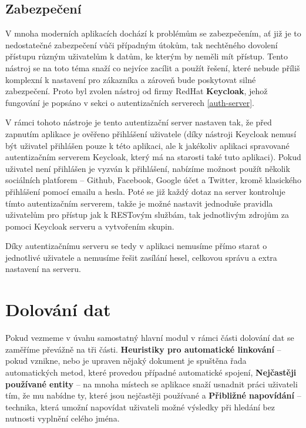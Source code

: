 \subsection{Zabezpečení}
\par V mnoha moderních aplikacích dochází k problémům se zabezpečením, ať již je to nedostatečné zabezpečení vůči případným útokům, tak nechtěného dovolení přístupu různým uživatelům k datům, ke kterým by neměli mít přístup. Tento nástroj se na toto téma snaží co nejvíce zacílit a použít řešení, které nebude příliš komplexní k nastavení pro zákazníka a zároveň bude poskytovat silné zabezpečení. Proto byl zvolen nástroj od firmy RedHat \textbf{Keycloak}, jehož fungování je popsáno v sekci o autentizačních serverech \ref{auth-server}.

\par V rámci tohoto nástroje je tento autentizační server nastaven tak, že před zapnutím aplikace je ověřeno přihlášení uživatele (díky nástroji Keycloak nemusí být uživatel přihlášen pouze k této aplikaci, ale k jakékoliv aplikaci spravované autentizačním serverem Keycloak, který má na starosti také tuto aplikaci). Pokud uživatel není přihlášen je vyzván k přihlášení, nabízíme možnost použít několik sociálních platforem -- Github, Facebook, Google účet a Twitter, kromě klasického přihlášení pomocí emailu a hesla. Poté se již každý dotaz na server kontroluje tímto autentizačním serverem, takže je možné nastavit jednoduše pravidla uživatelům pro přístup jak k RESTovým službám, tak jednotlivým zdrojům za pomoci Keycloak serveru a vytvořením skupin.

\par Díky autentizačnímu serveru se tedy v aplikaci nemusíme přímo starat o jednotlivé uživatele a nemusíme řešit zasílání hesel, celkovou správu a extra nastavení na serveru.

\section{Dolování dat}
\par Pokud vezmeme v úvahu samostatný hlavní modul v rámci části dolování dat se zaměříme převážně na tři části. \textbf{Heuristiky pro automatické linkování} -- pokud vznikne, nebo je upraven nějaký dokument je spuštěna řada automatických metod, které provedou případné automatické spojení, \textbf{Nejčastěji používané entity} -- na mnoha místech se aplikace snaží usnadnit práci uživateli tím, že mu nabídne ty, které jsou nejčastěji používané a \textbf{Přibližné napovídání} -- technika, která umožní napovídat uživateli možné výsledky při hledání bez nutnosti vyplnění celého jména.

